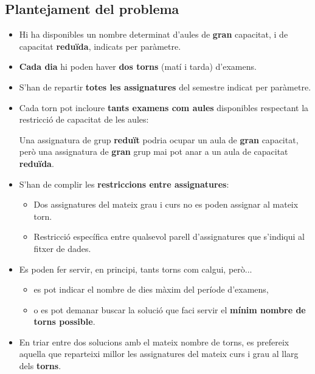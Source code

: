 \documentclass[10pt,a4paper]{../documents/class_material_assignatura_udg}
\begin{document}
\subsection{Plantejament del problema}

\begin{itemize}
\item Hi ha disponibles un nombre determinat d'aules de {\bf\textcolor{salmo}{g}ran} capacitat, i de capacitat {\bf\textcolor{salmo}{r}eduïda}, indicats per paràmetre.

\item \textbf{Cada dia} hi poden haver \textbf{dos torns} (matí i tarda) d'examens.
\item S'han de repartir \textbf{totes les assignatures} del semestre indicat per paràmetre.
\item Cada torn pot incloure \textbf{tants examens com aules} disponibles respectant la restricció de capacitat de les aules:

Una assignatura de grup {\bf\textcolor{salmo}{r}eduït} podria ocupar un aula de {\bf\textcolor{salmo}{g}ran} capacitat, però una assignatura de {\bf\textcolor{salmo}{g}ran} grup mai pot anar a un aula de capacitat {\bf\textcolor{salmo}{r}eduïda}.
\item S'han de complir les \textbf{restriccions entre assignatures}:
    \begin{itemize}
        \item Dos assignatures del mateix grau i curs no es poden assignar al mateix torn.
        \item Restricció específica entre qualsevol parell d'assignatures que s'indiqui al fitxer de dades.
    \end{itemize}

\item Es poden fer servir, en principi, tants torns com calgui, però...
    \begin{itemize}
        \item es pot indicar el nombre de dies màxim del període d'examens, 
        
        \item o es pot demanar buscar la solució que faci servir el \textbf{mínim nombre de torns possible}.
    \end{itemize}

\item En triar entre dos solucions amb el mateix nombre de torns, es prefereix aquella que reparteixi millor les assignatures del mateix curs i grau al llarg dels \textbf{torns}.


\end{itemize}
\end{document}

